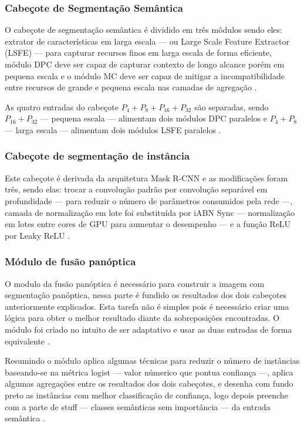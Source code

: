 \subsubsection*{Cabeçote de Segmentação Semântica}

O cabeçote de segmentação semântica é dividido em três môdulos sendo eles: extrator de características em larga escala — ou Large Scale Feature Extractor (LSFE) — para capturar recursos finos em larga escala de forma eficiente, módulo DPC deve ser capaz de capturar contexto de longo alcance porém em pequena escala e o módulo MC deve ser capaz de mitigar a incompatibilidade entre recursos de grande e pequena escala nas camadas de agregação \cite{mohan2020efficientps}.

As quatro entradas do cabeçote $ P_4 + P_8 + P_{16} + P_{32} $ são separadas, sendo $ P_{16} + P_{32} $ — pequena escala — alimentam dois módulos DPC paralelos e $ P_4 + P_8 $ — larga escala — alimentam dois módulos LSFE paralelos \cite{mohan2020efficientps}.

\subsubsection*{Cabeçote de segmentação de instância}

Este cabeçote é derivada da arquitetura Mask R-CNN e as modificações foram três, sendo elas: trocar a convolução padrão por convolução separável em profundidade — para reduzir o número de parâmetros consumidos pela rede —, camada de normalização em lote foi substituída por iABN Sync — normalização em lotes entre cores de GPU para aumentar o desempenho — e a função ReLU por Leaky ReLU \cite{mohan2020efficientps,redes-neurais-convolucionais-separaveis-em-profundidade, serp-ai}.
	

\subsubsection*{Módulo de fusão panóptica}

O modulo da fusão panóptica é necessário para construir a imagem com segmentação panóptica, nessa parte é fundido os resultados dos dois cabeçotes anteriormente explicados. Esta tarefa não é simples pois é necessário criar uma lógica para obter o melhor resultado diante da sobreposições encontradas. O módulo foi criado no intuito de ser adaptativo e usar as duas entradas de forma equivalente \cite{mohan2020efficientps}.

Resumindo o módulo aplica algumas técnicas para reduzir o número de instâncias baseando-se na métrica logist — valor númerico que pontua confiança —, aplica algumas agregações entre os resultados dos dois cabeçotes, e desenha com fundo preto as instâncias com melhor classificação de confiança, logo depois preenche com a parte de stuff — classes semânticas sem importância — da entrada semântica \cite{mohan2020efficientps}.